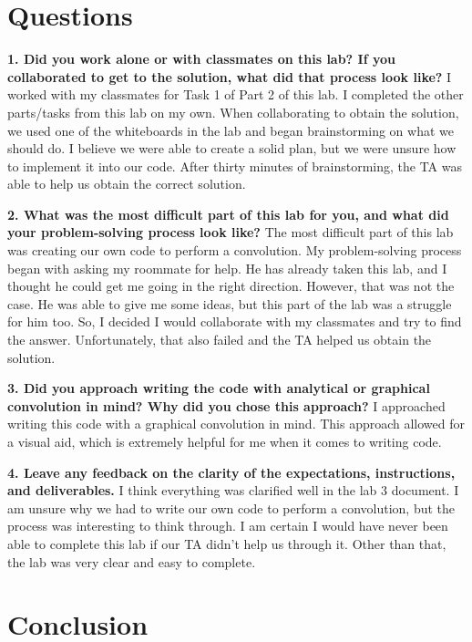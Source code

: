 \documentclass[12pt]{report}
\begin{document}
\section{Questions}

\textbf{1. Did you work alone or with classmates on this lab? If you collaborated to get to the solution,
what did that process look like?}
{I worked with my classmates for Task 1 of Part 2 of this lab. I completed the other parts/tasks from this lab on my own. When collaborating to obtain the solution, we used one of the whiteboards in the lab and began brainstorming on what we should do. I believe we were able to create a solid plan, but we were unsure how to implement it into our code. After thirty minutes of brainstorming, the TA was able to help us obtain the correct solution.}

\textbf{2. What was the most difficult part of this lab for you, and what did your problem-solving
process look like?}
{The most difficult part of this lab was creating our own code to perform a convolution. My problem-solving process began with asking my roommate for help. He has already taken this lab, and I thought he could get me going in the right direction. However, that was not the case. He was able to give me some ideas, but this part of the lab was a struggle for him too. So, I decided I would collaborate with my classmates and try to find the answer. Unfortunately, that also failed and the TA helped us obtain the solution. }

\textbf{3. Did you approach writing the code with analytical or graphical convolution in mind? Why
did you chose this approach?}
{I approached writing this code with a graphical convolution in mind. This approach allowed for a visual aid, which is extremely helpful for me when it comes to writing code.}

\textbf{4. Leave any feedback on the clarity of the expectations, instructions, and deliverables.}
{I think everything was clarified well in the lab 3 document. I am unsure why we had to write our own code to perform a convolution, but the process was interesting to think through. I am certain I would have never been able to complete this lab if our TA didn't help us through it. Other than that, the lab was very clear and easy to complete. }

\newpage

\section{Conclusion}
\end{document}
